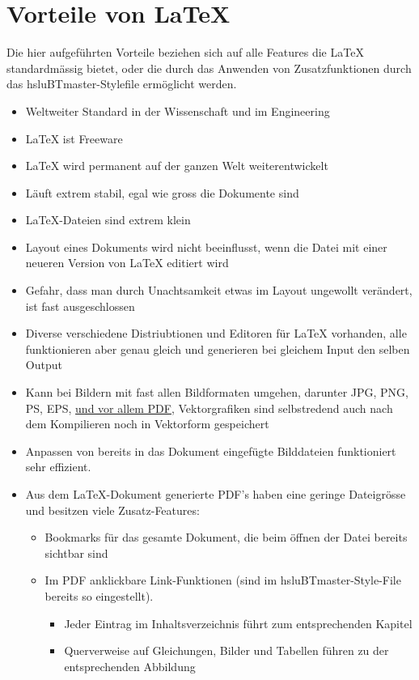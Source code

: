 \section{Vorteile von \LaTeX} \label{seVorteileLatex}%
%
Die hier aufgeführten Vorteile beziehen sich auf alle Features die \LaTeX{} standardmässig bietet, oder die durch das Anwenden von Zusatzfunktionen durch das hsluBTmaster-Stylefile ermöglicht werden.%
%
\begin{itemize}
\item Weltweiter Standard in der Wissenschaft und im Engineering%
\item \LaTeX{} ist Freeware%
\item \LaTeX{} wird permanent auf der ganzen Welt weiterentwickelt%
\item Läuft extrem stabil, egal wie gross die Dokumente sind%
\item \LaTeX -Dateien sind extrem klein%
\item Layout eines Dokuments wird nicht beeinflusst, wenn die Datei mit einer neueren Version von \LaTeX{} editiert wird%
\item Gefahr, dass man durch Unachtsamkeit etwas im Layout ungewollt verändert, ist fast ausgeschlossen%
\item Diverse verschiedene Distriubtionen und Editoren für \LaTeX{} vorhanden, alle funktionieren aber genau gleich und generieren bei gleichem Input den selben Output%
\item Kann bei Bildern mit fast allen Bildformaten umgehen, darunter JPG, PNG, PS, EPS, \linebreak \underline{und vor allem PDF}, Vektorgrafiken sind selbstredend auch nach dem Kompilieren noch in Vektorform gespeichert%
\item  Anpassen von bereits in das Dokument eingefügte Bilddateien funktioniert sehr effizient.%
\item Aus dem \LaTeX -Dokument generierte PDF's haben eine geringe Dateigrösse und besitzen viele Zusatz-Features:%
%
\begin{itemize}
\item Bookmarks für das gesamte Dokument, die beim öffnen der Datei bereits sichtbar sind%
\item Im PDF anklickbare Link-Funktionen (sind im hsluBTmaster-Style-File bereits so eingestellt). %
%
\begin{itemize}
\item Jeder Eintrag im Inhaltsverzeichnis führt zum entsprechenden Kapitel%
\item Querverweise auf Gleichungen, Bilder und Tabellen führen zu der entsprechenden Abbildung%

\end{itemize}
\end{itemize}
\end{itemize}
